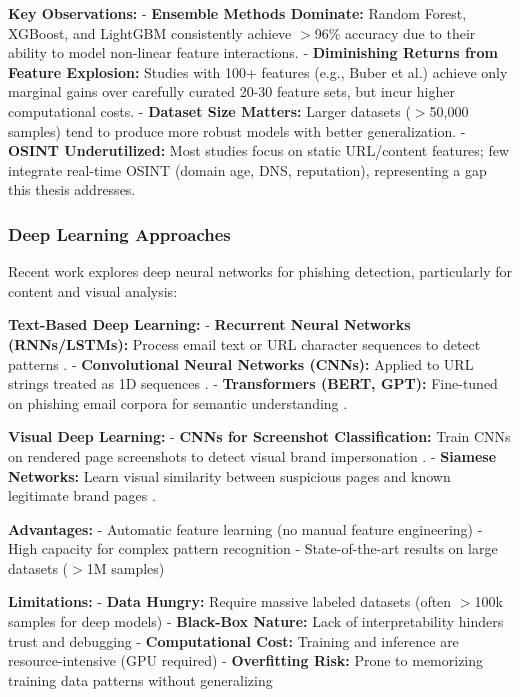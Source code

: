 \textbf{Key Observations:} - \textbf{Ensemble Methods Dominate:} Random
Forest, XGBoost, and LightGBM consistently achieve $>$96\%
accuracy due to their ability to model non-linear feature interactions.
- \textbf{Diminishing Returns from Feature Explosion:} Studies with 100+
features (e.g., Buber et al.) achieve only marginal gains over carefully
curated 20-30 feature sets, but incur higher computational costs. -
\textbf{Dataset Size Matters:} Larger datasets ($>$50,000
samples) tend to produce more robust models with better generalization.
- \textbf{OSINT Underutilized:} Most studies focus on static URL/content
features; few integrate real-time OSINT (domain age, DNS, reputation),
representing a gap this thesis addresses.

\subsubsection{Deep Learning
Approaches}\label{deep-learning-approaches}

Recent work explores deep neural networks for phishing detection,
particularly for content and visual analysis:

\textbf{Text-Based Deep Learning:} - \textbf{Recurrent Neural Networks
(RNNs/LSTMs):} Process email text or URL character sequences to detect
patterns \cite{aljofey2020}. - \textbf{Convolutional Neural Networks (CNNs):}
Applied to URL strings treated as 1D sequences \cite{li2019}. -
\textbf{Transformers (BERT, GPT):} Fine-tuned on phishing email corpora
for semantic understanding \cite{hiransha2022}.

\textbf{Visual Deep Learning:} - \textbf{CNNs for Screenshot
Classification:} Train CNNs on rendered page screenshots to detect
visual brand impersonation \cite{jain2018}. - \textbf{Siamese Networks:} Learn
visual similarity between suspicious pages and known legitimate brand
pages \cite{dhamija2006}.

\textbf{Advantages:} - Automatic feature learning (no manual feature
engineering) - High capacity for complex pattern recognition -
State-of-the-art results on large datasets ($>$1M samples)

\textbf{Limitations:} - \textbf{Data Hungry:} Require massive labeled
datasets (often $>$100k samples for deep models) -
\textbf{Black-Box Nature:} Lack of interpretability hinders trust and
debugging - \textbf{Computational Cost:} Training and inference are
resource-intensive (GPU required) - \textbf{Overfitting Risk:} Prone to
memorizing training data patterns without generalizing

